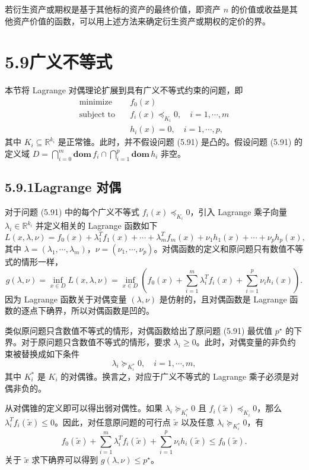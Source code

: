 \documentclass[UTF8,12pt,a4paper,fontset=fandol]{ctexart}
\begin{document}
若衍生资产或期权是基于其他标的资产的最终价值，即资产 $n$ 的价值或收益是其他资产价值的函数，可以用上述方法来确定衍生资产或期权的定价的界。

\section*{5.9\quad 广义不等式}

本节将 Lagrange 对偶理论扩展到具有广义不等式约束的问题，即
\begin{equation}
\begin{aligned}
\text{minimize}\quad & f_0(x)\\
\text{subject to}\quad & f_i(x)\preceq_{K_i}0,\quad i=1,\cdots,m\\
& h_i(x)=0,\quad i=1,\cdots,p,
\end{aligned}
\tag{5.91}
\end{equation}
其中 $K_i\subseteq\mathbb{R}^{k_i}$ 是正常锥。此时，并不假设问题 (5.91) 是凸的。假设问题 (5.91) 的定义域 $D=\bigcap_{i=0}^m\mathbf{dom}\,f_i\cap\bigcap_{i=1}^p\mathbf{dom}\,h_i$ 非空。

\subsection*{5.9.1\quad Lagrange 对偶}

对于问题 (5.91) 中的每个广义不等式 $f_i(x)\preceq_{K_i}0$，引入 Lagrange 乘子向量 $\lambda_i\in\mathbb{R}^{k_i}$ 并定义相关的 Lagrange 函数如下
\[
L(x,\lambda,\nu)=f_0(x)+\lambda_1^Tf_1(x)+\cdots+\lambda_m^Tf_m(x)+\nu_1h_1(x)+\cdots+\nu_ph_p(x),
\]
其中 $\lambda=(\lambda_1,\cdots,\lambda_m)$，$\nu=(\nu_1,\cdots,\nu_p)$。对偶函数的定义和原问题只有数值不等式的情形一样，
\[
g(\lambda,\nu)=\inf_{x\in D}L(x,\lambda,\nu)
=\inf_{x\in D}\left(f_0(x)+\sum_{i=1}^m\lambda_i^Tf_i(x)+\sum_{i=1}^p\nu_i h_i(x)\right).
\]
因为 Lagrange 函数关于对偶变量 $(\lambda,\nu)$ 是仿射的，且对偶函数是 Lagrange 函数的逐点下确界，所以对偶函数是凹的。

类似原问题只含数值不等式的情形，对偶函数给出了原问题 (5.91) 最优值 $p^\star$ 的下界。对于原问题只含数值不等式的情形，要求 $\lambda_i\geq 0$。此时，对偶变量的非负约束被替换成如下条件
\[
\lambda_i\succeq_{K_i^\ast}0,\quad i=1,\cdots,m,
\]
其中 $K_i^\ast$ 是 $K_i$ 的对偶锥。换言之，对应于广义不等式的 Lagrange 乘子必须是对偶非负的。

从对偶锥的定义即可以得出弱对偶性。如果 $\lambda_i\succeq_{K_i^\ast}0$ 且 $f_i(\tilde{x})\preceq_{K_i}0$，那么 $\lambda_i^Tf_i(\tilde{x})\leq 0$。因此，对任意原问题的可行点 $\tilde{x}$ 以及任意 $\lambda_i\succeq_{K_i^\ast}0$，有
\[
f_0(\tilde{x})+\sum_{i=1}^m\lambda_i^Tf_i(\tilde{x})+\sum_{i=1}^p\nu_i h_i(\tilde{x})\leq f_0(\tilde{x}).
\]
关于 $\tilde{x}$ 求下确界可以得到 $g(\lambda,\nu)\leq p^\star$。
\end{document}
